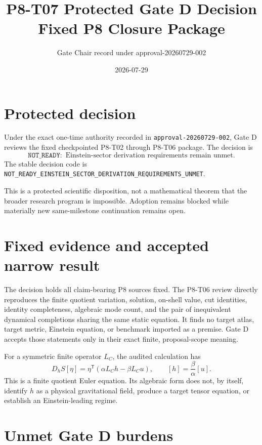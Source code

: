 \documentclass[11pt]{article}
\title{P8-T07 Protected Gate D Decision\\
\large Fixed P8 Closure Package}
\author{Gate Chair record under approval-20260729-002}
\date{2026-07-29}
\newcommand{\GateVerdict}{\texttt{NOT\_READY}}
\begin{document}
\maketitle

\section{Protected decision}

Under the exact one-time authority recorded in
\texttt{approval-20260729-002}, Gate D reviews the fixed checkpointed
P8-T02 through P8-T06 package.  The decision is
\[
  \boxed{\GateVerdict:
  \text{ Einstein-sector derivation requirements remain unmet}.}
\]
The stable decision code is
\texttt{NOT\_READY\_EINSTEIN\_SECTOR\_DERIVATION\_REQUIREMENTS\_UNMET}.

This is a protected scientific disposition, not a mathematical theorem that
the broader research program is impossible.  Adoption remains blocked while
materially new same-milestone continuation remains open.

\section{Fixed evidence and accepted narrow result}

The decision holds all claim-bearing P8 sources fixed.  The P8-T06 review
directly reproduces the finite quotient variation, solution, on-shell value,
cut identities, identity completeness, algebraic mode count, and the pair of
inequivalent dynamical completions sharing the same static equation.  It finds
no target atlas, target metric, Einstein equation, or benchmark imported as a
premise.  Gate D accepts those statements only in their exact finite,
proposal-scope meaning.

For a symmetric finite operator \(L_C\), the audited calculation has
\[
  D_hS[\eta]
  =\eta^{\mathsf T}\!\left(\alpha L_Ch-\beta L_Cu\right),
  \qquad
  [h]=\frac{\beta}{\alpha}[u].
\]
This is a finite quotient Euler equation.  Its algebraic form does not, by
itself, identify \(h\) as a physical gravitational field, produce a target
tensor equation, or establish an Einstein-leading regime.

\section{Unmet Gate D burdens}
\end{document}

